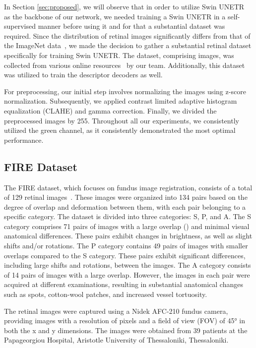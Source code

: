 \documentclass[10pt,twocolumn,letterpaper]{article}
\begin{document}
In Section \ref{sec:proposed}, we will observe that in order to utilize Swin UNETR~\cite{hatamizadeh2021swin} as the backbone of our network, we needed training a Swin UNETR in a self-supervised manner before using it and for that a substantial dataset was required. Since the distribution of retinal images significantly differs from that of the ImageNet data~\cite{deng2009imagenet}, we made the decision to gather a substantial retinal dataset specifically for training Swin UNETR. The dataset, comprising  images, was collected from various online resources~\cite{KaggleDiabeticRetinopathy,KaggleGlaucomaDatasets, sarhan2021transfer,hernandez2017fire,RetinalDiseaseClassification} by our team. Additionally, this dataset was utilized to train the descriptor decoders as well.

For preprocessing, our initial step involves normalizing the images using z-score normalization. Subsequently, we applied contrast limited adaptive histogram equalization (CLAHE) and gamma correction. Finally, we divided the preprocessed images by 255. Throughout all our experiments, we consistently utilized the green channel, as it consistently demonstrated the most optimal performance.





\subsection{FIRE Dataset}

The FIRE dataset, which focuses on fundus image registration, consists of a total of 129 retinal images~\cite{hernandez2017fire}. These images were organized into 134 pairs based on the degree of overlap and deformation between them, with each pair belonging to a specific category. The dataset is divided into three categories: S, P, and A. The S category comprises 71 pairs of images with a large overlap () and minimal visual anatomical differences. These pairs exhibit changes in brightness, as well as slight shifts and/or rotations. The P category contains 49 pairs of images with smaller overlaps compared to the S category. These pairs exhibit significant differences, including large shifts and rotations, between the images. The A category consists of 14 pairs of images with a large overlap. However, the images in each pair were acquired at different examinations, resulting in substantial anatomical changes such as spots, cotton-wool patches, and increased vessel tortuosity.

The retinal images were captured using a Nidek AFC-210 fundus camera, providing images with a resolution of  pixels and a field of view (FOV) of 45° in both the x and y dimensions. The images were obtained from 39 patients at the Papageorgiou Hospital, Aristotle University of Thessaloniki, Thessaloniki.
\end{document}
